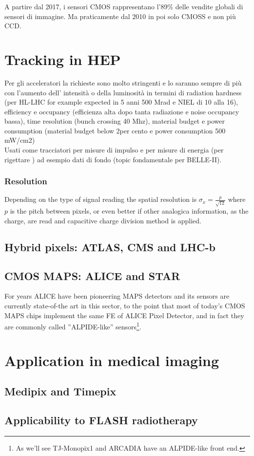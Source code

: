 A partire dal 2017, i sensori CMOS rappresentano l'89\% delle vendite globali di sensori di immagine. Ma praticamente dal 2010 in poi solo CMOSS e non più CCD.\\

\section{Tracking in HEP}
    Per gli acceleratori la richieste sono molto stringenti e lo saranno sempre di più con l'aumento dell' intensità o della luminosità in termini di radiation hardness (per HL-LHC for example expected in 5 anni 500 Mrad e NIEL di 10 alla 16), efficiency e occupancy (efficienza alta dopo tanta radiazione e noise occupancy bassa), time resolution (bunch crossing 40 Mhz), material budget e power consumption (material budget below 2per cento e power consumption 500 mW/cm2)\\
    Usati come tracciatori per misure di impulso e per misure di energia (per rigettare ) ad esempio dati di fondo (topic fondamentale per BELLE-II).

    \subsubsection{Resolution}
        Depending on the type of signal reading the spatial resolution is  $\sigma_x = \frac{p}{\sqrt{12}}$ where $p$ is the pitch between pixels, or even better if other 
        analogica information, as the charge, are read and capacitive charge division method is applied.

    \subsection{Hybrid pixels: ATLAS, CMS and LHC-b}
    \subsection{CMOS MAPS: ALICE and STAR}
         For years ALICE have been pioneering MAPS detectors and its sensors are currently state-of-the art in this sector, to the point that most of today’s CMOS MAPS chips implement the same FE of ALICE Pixel Detector, and in fact they are commonly called ”ALPIDE-like” sensors\footnote{As we'll see TJ-Monopix1 and ARCADIA have an ALPIDE-like front end.}.
        
        

\section{Application in medical imaging}
    \subsection{Medipix and Timepix}
    \subsection{Applicability to FLASH radiotherapy}